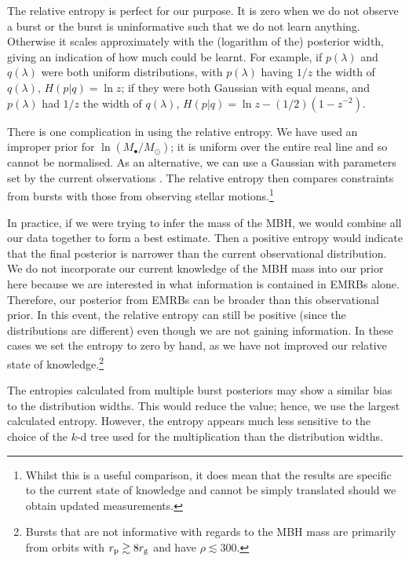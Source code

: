 The relative entropy is perfect for our purpose. It is zero when we do not observe a burst or the burst is uninformative such that we do not learn anything. Otherwise it scales approximately with the (logarithm of the) posterior width, giving an indication of how much could be learnt. For example, if $p(\lambda)$ and $q(\lambda)$ were both uniform distributions, with $p(\lambda)$ having $1/z$ the width of $q(\lambda)$, $H(p|q) = \ln z$; if they were both Gaussian with equal means, and $p(\lambda)$ had $1/z$ the width of $q(\lambda)$, $H(p|q) = \ln z - (1/2)(1 - z^{-2})$.

There is one complication in using the relative entropy. We have used an improper prior for $\ln (M_\bullet/M_\odot)$; it is uniform over the entire real line and so cannot be normalised. As an alternative, we can use a Gaussian with parameters set by the current observations \citep{Gillessen2009}. The relative entropy then compares constraints from bursts with those from observing stellar motions.\footnote{Whilst this is a useful comparison, it does mean that the results are specific to the current state of knowledge and cannot be simply translated should we obtain updated measurements.}

In practice, if we were trying to infer the mass of the MBH, we would combine all our data together to form a best estimate. Then a positive entropy would indicate that the final posterior is narrower than the current observational distribution. We do not incorporate our current knowledge of the MBH mass into our prior here because we are interested in what information is contained in EMRBs alone. Therefore, our posterior from EMRBs can be broader than this observational prior. In this event, the relative entropy can still be positive (since the distributions are different) even though we are not gaining information. In these cases we set the entropy to zero by hand, as we have not improved our relative state of knowledge.\footnote{Bursts that are not informative with regards to the MBH mass are primarily from orbits with $r_\mathrm{p} \gtrsim 8 r_\mathrm{g}$ and have $\rho \lesssim 300$.}

The entropies calculated from multiple burst posteriors may show a similar bias to the distribution widths. This would reduce the value; hence, we use the largest calculated entropy. However, the entropy appears much less sensitive to the choice of the $k$-d tree used for the multiplication than the distribution widths. %


